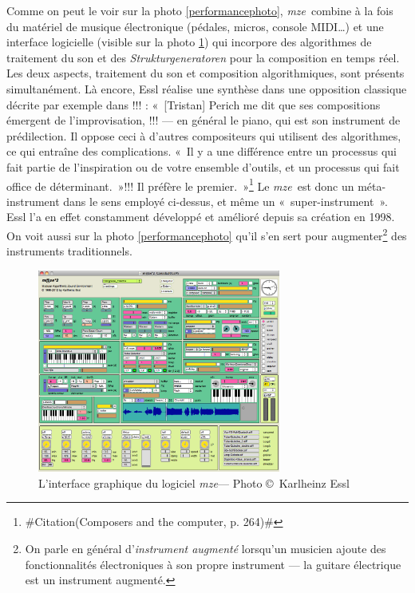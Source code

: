 \documentclass[a4paper,12pt]{article}
\newcommand{\guill}[1]{«~#1~»}
\newcommand{\zitat}[2]{\#Citation(#2)\#}
\newcommand{\maze}[0]{\emph{m\symbol{64}ze\textdegree2}}
\begin{document}
Comme on peut le voir sur la photo \ref{performancephoto}, \maze~combine à la fois du matériel de musique électronique (pédales, micros, console MIDI\dots) et une interface logicielle (visible sur la photo \ref{mazephoto}) qui incorpore des algorithmes de traitement du son et des \emph{Strukturgeneratoren} pour la composition en temps réel. Les deux aspects, traitement du son et composition algorithmiques, sont présents simultanément. Là encore, Essl réalise une synthèse dans une opposition classique décrite par exemple dans !!! : \guill{[Tristan] Perich me dit que ses compositions émergent de l'improvisation, !!! --- en général le piano, qui est son instrument de prédilection. Il oppose ceci à d'autres compositeurs qui utilisent des algorithmes, ce qui entraîne des complications. \guill{Il y a une différence entre un processus qui fait partie de l'inspiration ou de votre ensemble d'outils, et un processus qui fait office de déterminant.}!!! Il préfère le premier.}\footnote{\zitat{[Tristan] Perich tells me that his compositions spring from improvisation, the mind at play --- usually at the piano, which is his main instrument. He constrats this with other composers who use algorithms, which introduce complications. \guill{There's a difference between process being part of the inspiration or the tool set that you have, and process being a determinant.} He prefers the former.}
{Composers and the computer, p. 264}}
Le \maze~est donc un méta-instrument dans le sens employé ci-dessus, et même un \guill{super-instrument}. Essl l'a en effet constamment développé et amélioré depuis sa création en 1998. On voit aussi sur la photo \ref{performancephoto} qu'il s'en sert pour augmenter\footnote{On parle en général d'\emph{instrument augmenté} lorsqu'un musicien ajoute des fonctionnalités électroniques à son propre instrument --- la guitare électrique est un instrument augmenté.} des instruments traditionnels.

\begin{figure}[h!]
\begin{center}
\includegraphics[width=8cm]{images/maze.png}
\caption{L'interface graphique du logiciel \maze --- Photo \copyright~Karlheinz Essl}
\label{mazephoto}
\end{center}
\end{figure}
\end{document}
